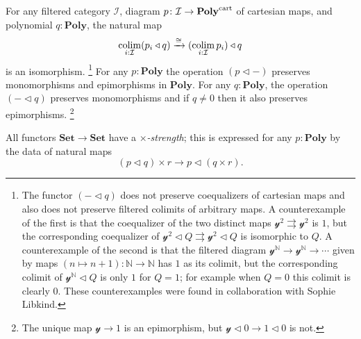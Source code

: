 \documentclass[11pt, one side, article]{memoir}
\theoremstyle{definition}
\theoremstyle{plain}
\DeclareMathOperator*{\colim}{colim}
\newcommand{\cat}[1]{\mathcal{#1}}%
\newcommand{\Cat}[1]{\mathbf{#1}}%
\newcommand{\tto}{\rightrightarrows}
\newcommand{\To}[2][]{\xrightarrow[#1]{\tn{$#2$}}}
\newcommand{\tn}[1]{\textnormal{#1}}
\newcommand{\nn}{\mathbb{N}}
\newcommand{\smset}{\Cat{Set}}
\newcommand{\yon}{{\mathcal{y}}}
\newcommand{\poly}{\Cat{Poly}}
\newcommand{\polycart}{\poly^{\tn{cart}}}
\newcommand{\0}{\textsf{0}}
\newcommand{\1}{\tn{\textsf{1}}}
\newcommand{\tri}{\mathbin{\triangleleft}}
\begin{document}
For any filtered category $\cat{I}$, diagram $p\colon \cat{I}\to\polycart$ of cartesian maps, and polynomial $q:\poly$, the natural map
\begin{equation}\label{eqn.cart_tri}
	\colim_{i: \cat{I}}(p_i\tri q)
	\To{\cong}
	(\colim_{i: \cat{I}}p_i)\tri q
\end{equation}
is an isomorphism.%
\footnote{The functor $(-\tri q)$ does not preserve coequalizers of cartesian maps and also does not preserve filtered colimits of arbitrary maps. A counterexample of the first is that the coequalizer of the two distinct maps $\yon^2\tto\yon^2$ is $1$, but the corresponding coequalizer of $\yon^2\tri Q\tto \yon^2\tri Q$ is isomorphic to $Q$. A counterexample of the second is that the filtered diagram $\yon^\nn\to\yon^\nn\to\cdots$ given by maps $(n\mapsto n+1)\colon\nn\to\nn$ has $1$ as its colimit, but the corresponding colimit of $\yon^\nn\tri Q$ is only $1$ for $Q=1$; for example when $Q=0$ this colimit is clearly $0$. These counterexamples were found in collaboration with Sophie Libkind.
}
 For any $p:\poly$ the operation $(p\tri -)$ preserves monomorphisms and epimorphisms in $\poly$. For any $q:\poly$, the operation $(-\tri q)$ preserves monomorphisms and if $q\neq 0$ then it also preserves epimorphisms.%
\footnote{The unique map $\yon\to 1 $ is an epimorphism, but $\yon\tri 0\to 1\tri 0$ is not.}

All functors $\smset\to\smset$ have a \emph{$\times$-strength}; this is expressed for any $p:\poly$ by the data of natural maps
\begin{equation}\label{eqn.strength}
	(p\tri q)\times r\to p\tri(q\times r).
\end{equation}
\end{document}
